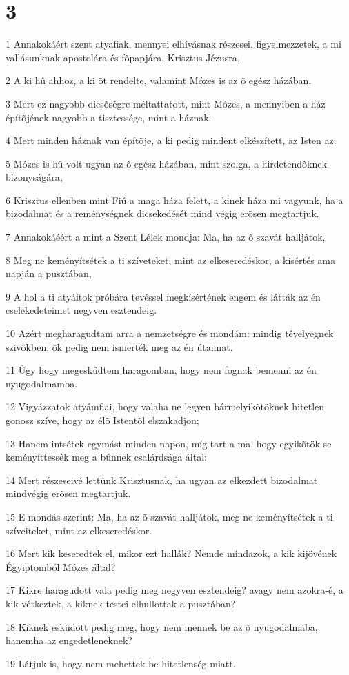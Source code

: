 \chapter{3}

\par 1 Annakokáért szent atyafiak, mennyei elhívásnak részesei, figyelmezzetek, a mi vallásunknak apostolára és fõpapjára, Krisztus Jézusra,
\par 2 A ki hû ahhoz, a ki õt rendelte, valamint  Mózes is az õ egész házában.
\par 3 Mert ez nagyobb dicsõségre méltattatott, mint Mózes, a mennyiben a ház építõjének nagyobb a tisztessége, mint a háznak.
\par 4 Mert minden háznak van építõje, a ki pedig mindent elkészített, az Isten az.
\par 5 Mózes is hû volt ugyan az õ egész házában, mint szolga, a hirdetendõknek bizonyságára,
\par 6 Krisztus ellenben mint Fiú a maga háza felett, a kinek háza mi vagyunk, ha a bizodalmat és a reménységnek dicsekedését mind végig erõsen megtartjuk.
\par 7 Annakokáéért a mint a Szent Lélek mondja: Ma, ha az õ szavát halljátok,
\par 8 Meg ne keményítsétek a ti szíveteket, mint az elkeseredéskor, a kísértés ama napján a pusztában,
\par 9 A hol a ti atyáitok próbára tevéssel megkísértének engem és látták az én cselekedeteimet negyven esztendeig.
\par 10 Azért megharagudtam arra a nemzetségre és mondám: mindig tévelyegnek szivökben; õk pedig nem ismerték meg az én útaimat.
\par 11 Úgy hogy megesküdtem haragomban, hogy nem fognak bemenni az én nyugodalmamba.
\par 12 Vigyázzatok atyámfiai, hogy valaha ne legyen bármelyikõtöknek hitetlen gonosz szíve, hogy az élõ Istentõl elszakadjon;
\par 13 Hanem intsétek egymást minden napon, míg tart a ma, hogy egyikõtök se keményíttessék meg a bûnnek csalárdsága által:
\par 14 Mert részeseivé lettünk Krisztusnak, ha ugyan az elkezdett bizodalmat mindvégig erõsen megtartjuk.
\par 15 E mondás szerint: Ma, ha az õ szavát halljátok, meg ne keményítsétek a ti szíveiteket, mint az elkeseredéskor.
\par 16 Mert kik keseredtek el, mikor ezt hallák? Nemde mindazok, a kik kijövének Égyiptomból Mózes által?
\par 17 Kikre haragudott vala pedig meg negyven esztendeig? avagy nem azokra-é, a kik vétkeztek, a kiknek testei elhullottak a pusztában?
\par 18 Kiknek esküdött pedig meg, hogy nem mennek be az õ nyugodalmába, hanemha az engedetleneknek?
\par 19 Látjuk is, hogy nem mehettek be hitetlenség miatt.

